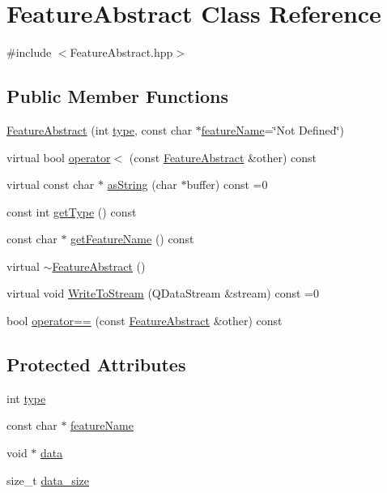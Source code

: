 \hypertarget{class_feature_abstract}{\section{Feature\+Abstract Class Reference}
\label{class_feature_abstract}
}


{\ttfamily \#include $<$Feature\+Abstract.\+hpp$>$}

\subsection*{Public Member Functions}
\begin{DoxyCompactItemize}
\item 
\hyperlink{class_feature_abstract_afb925654d107910da20b213080e8a013}{Feature\+Abstract} (int \hyperlink{class_feature_abstract_acab3574e41f892ae811b4adac8f5840a}{type}, const char $\ast$\hyperlink{class_feature_abstract_ae11ff57d87c0e49cf1cf95d71f407979}{feature\+Name}=\char`\"{}Not Defined\char`\"{})
\item 
virtual bool \hyperlink{class_feature_abstract_a88fb78d10c6f5395c88ff0ae23fe8b8f}{operator$<$} (const \hyperlink{class_feature_abstract}{Feature\+Abstract} \&other) const 
\item 
virtual const char $\ast$ \hyperlink{class_feature_abstract_af9ffe853716e6a28135ae1c33fafeafd}{as\+String} (char $\ast$buffer) const =0
\item 
const int \hyperlink{class_feature_abstract_a4cb21d5a97d7f537cda3c919c266a6cf}{get\+Type} () const 
\item 
const char $\ast$ \hyperlink{class_feature_abstract_a4b12b0d228da1c7e21429f263bef004e}{get\+Feature\+Name} () const 
\item 
virtual \hyperlink{class_feature_abstract_ad4a51a8818f23596fc88ef89a79ff125}{$\sim$\+Feature\+Abstract} ()
\item 
virtual void \hyperlink{class_feature_abstract_a0c2c3d93b7bf635de628fc02413f784e}{Write\+To\+Stream} (Q\+Data\+Stream \&stream) const =0
\item 
bool \hyperlink{class_feature_abstract_a8a2253d5e532ba6c95fe3653558c30c5}{operator==} (const \hyperlink{class_feature_abstract}{Feature\+Abstract} \&other) const 
\end{DoxyCompactItemize}
\subsection*{Protected Attributes}
\begin{DoxyCompactItemize}
\item 
int \hyperlink{class_feature_abstract_acab3574e41f892ae811b4adac8f5840a}{type}
\item 
const char $\ast$ \hyperlink{class_feature_abstract_ae11ff57d87c0e49cf1cf95d71f407979}{feature\+Name}
\item 
void $\ast$ \hyperlink{class_feature_abstract_a088a09441e0d60ad556c37910e51e8a6}{data}
\item 
size\+\_\+t \hyperlink{class_feature_abstract_a99b0e94ca4cdf08688924517946b5743}{data\+\_\+size}
\end{DoxyCompactItemize}
